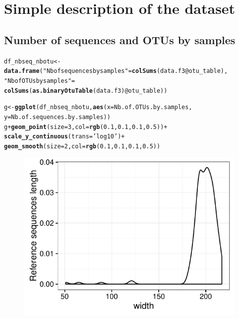 \documentclass[12pt]{article}\usepackage[]{graphicx}\usepackage[]{color}
\makeatletter
\def\maxwidth{ %
  \ifdim\Gin@nat@width>\linewidth
    \linewidth
  \else
    \Gin@nat@width
  \fi
}
\newcommand{\hlnum}[1]{\textcolor[rgb]{0.686,0.059,0.569}{#1}}%
\newcommand{\hlstr}[1]{\textcolor[rgb]{0.192,0.494,0.8}{#1}}%
\newcommand{\hlopt}[1]{\textcolor[rgb]{0,0,0}{#1}}%
\newcommand{\hlstd}[1]{\textcolor[rgb]{0.345,0.345,0.345}{#1}}%
\newcommand{\hlkwb}[1]{\textcolor[rgb]{0.69,0.353,0.396}{#1}}%
\newcommand{\hlkwc}[1]{\textcolor[rgb]{0.333,0.667,0.333}{#1}}%
\newcommand{\hlkwd}[1]{\textcolor[rgb]{0.737,0.353,0.396}{\textbf{#1}}}%
\newenvironment{kframe}{%
 \def\at@end@of@kframe{}%
 \ifinner\ifhmode%
  \def\at@end@of@kframe{\end{minipage}}%
  \begin{minipage}{\columnwidth}%
 \fi\fi%
 \def\FrameCommand##1{\hskip\@totalleftmargin \hskip-\fboxsep
 \colorbox{shadecolor}{##1}\hskip-\fboxsep
     \hskip-\linewidth \hskip-\@totalleftmargin \hskip\columnwidth}%
 \MakeFramed {\advance\hsize-\width
   \@totalleftmargin\z@ \linewidth\hsize
   \@setminipage}}%
 {\par\unskip\endMakeFramed%
 \at@end@of@kframe}
\newenvironment{knitrout}{}{} %
\numberwithin{figure}{section}
\makeatother
\begin{document}
\section{Simple description of the dataset}

  \subsection{Number of sequences and OTUs by samples}

\begin{knitrout}\small
{}\color{fgcolor}\begin{kframe}
\begin{alltt}
\hlstd{df_nbseq_nbotu} \hlkwb{<-} \hlkwd{data.frame}\hlstd{(}\hlstr{"Nb of sequences by samples"} \hlstd{=} \hlkwd{colSums}\hlstd{(data.f3}\hlopt{@}\hlkwc{otu_table}\hlstd{),}
                             \hlstr{"Nb of OTUs by samples"} \hlstd{=}
                               \hlkwd{colSums}\hlstd{(}\hlkwd{as.binaryOtuTable}\hlstd{(data.f3)}\hlopt{@}\hlkwc{otu_table}\hlstd{))}

\hlstd{g} \hlkwb{<-} \hlkwd{ggplot}\hlstd{(df_nbseq_nbotu,} \hlkwd{aes}\hlstd{(}\hlkwc{x} \hlstd{= Nb.of.OTUs.by.samples,}
                                \hlkwc{y} \hlstd{= Nb.of.sequences.by.samples))}
\hlstd{g} \hlopt{+} \hlkwd{geom_point}\hlstd{(}\hlkwc{size} \hlstd{=} \hlnum{3}\hlstd{,} \hlkwc{col} \hlstd{=} \hlkwd{rgb}\hlstd{(}\hlnum{0.1}\hlstd{,} \hlnum{0.1}\hlstd{,} \hlnum{0.1}\hlstd{,} \hlnum{0.5}\hlstd{))} \hlopt{+}
  \hlkwd{scale_y_continuous}\hlstd{(}\hlkwc{trans} \hlstd{=} \hlstr{'log10'}\hlstd{)} \hlopt{+}
  \hlkwd{geom_smooth}\hlstd{(}\hlkwc{size} \hlstd{=} \hlnum{2}\hlstd{,} \hlkwc{col} \hlstd{=} \hlkwd{rgb}\hlstd{(}\hlnum{0.1}\hlstd{,} \hlnum{0.1}\hlstd{,} \hlnum{0.1}\hlstd{,} \hlnum{0.5}\hlstd{))}
\end{alltt}


{\ttfamily\noindent\itshape\color{messagecolor}{\#\# `geom\_smooth()` using method = 'loess'}}\end{kframe}\begin{figure}

{\centering \includegraphics[width=\maxwidth]{figure/unnamed-chunk-20-1} 

}
\end{figure}
\end{knitrout}
\end{document}

